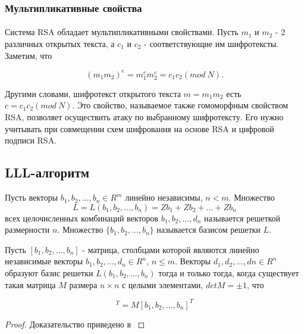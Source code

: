 \subsubsection{Мультипликативные свойства}

  \paragraph{} Система RSA обладает мультипликативными свойствами. Пусть $m_1$ и $m_2$ - 2 различных открытых текста, а $c_1$
  и $c_2$ - соответствующие им шифротексты. Заметим, что
  
    \begin{equation}
      (m_1 m_2)^e = m_1^e m_2^e = c_1 c_2 (mod \: N).
    \end{equation}

  Другими словами, шифротекст открытого текста $m = m_1 m_2$ есть \\ $c = c_1 c_2 (mod \: N)$. Это свойство, называемое также гомоморфным 
  свойством  RSA, позволяет осуществить атаку по выбранному шифротексту. Его нужно учитывать при совмещении схем шифрования на основе RSA и цифровой подписи
  RSA.

\subsection{LLL-алгоритм}

  \begin{definition}
    Пусть векторы $ b_1, b_2, \dots, b_n \in R^m$ линейно независимы, $n < m$. Множество 
      \begin{equation}
	       L=L(b_1, b_2, \dots, b_n) = Zb_1 + Zb_2 + \dots + Zb_n
      \end{equation}    
    всех целочисленных комбинаций векторов $ b_1, b_2, \dots, d_n$ называется решеткой размерности $n$. Множество
    $ \{b_1, b_2, \dots, b_n \} $ называется базисом решетки $L$.
  \end{definition}
  
  \begin{theorem}
    Пусть {$[b_1, b_2, \dots, b_n]$} - матрица, столбцами которой являются линейно независимые векторы {$ b_1, b_2, \dots, d_n \in R^n$}, {$n \le m$}.
    Векторы $ d_1, d_2, \dots, dn \in R^n$ образуют базис решетки {$L(b_1, b_2, \dots, b_n)$} тогда и только тогда, когда существует такая матрица
    {$M$} размера {$n \times n$} с целыми элементами, {$detM = \pm 1$}, что
    
      \begin{equation}
        [d_1, d_2, \dots, d_n]^T = M [b_1, b_2, \dots, b_n]^T
      \end{equation}

      \begin{proof}
        Доказательство приведено в \cite[Глава 8.2, страница 260]{mah06}
      \end{proof}
  \end{theorem}  

